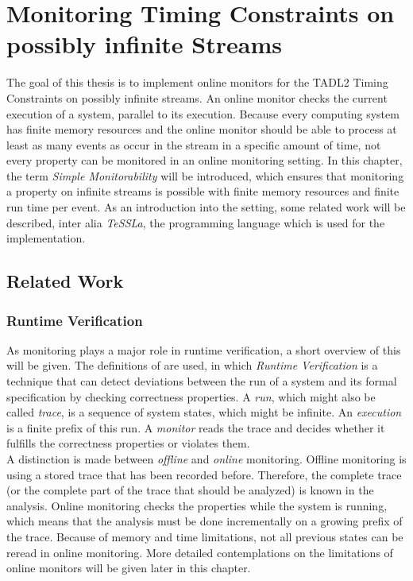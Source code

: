 
\chapter{Monitoring Timing Constraints on possibly infinite Streams}
\label{chapter-monitorability}
	The goal of this thesis is to implement online monitors for the TADL2 Timing Constraints on possibly infinite streams. An online monitor checks the current execution of a system, parallel to its execution. Because every computing system has finite memory resources and the online monitor should be able to process at least as many events as occur in the stream in a specific amount of time, not every property can be monitored in an online monitoring setting. In this chapter, the term \emph{Simple Monitorability} will be introduced, which ensures that monitoring a property on infinite streams is possible with finite memory resources and finite run time per event. As an introduction into the setting, some related work will be described, inter alia \emph{TeSSLa}, the programming language which is used for the implementation.

\section{Related Work}

	\subsection{Runtime Verification}
		As monitoring plays a major role in runtime verification, a short overview of this will be given. The definitions of \cite{RuntimeVerification} are used, in which \emph{Runtime Verification} is a technique that can detect deviations between the run of a system and its formal specification by checking correctness properties. A \emph{run}, which might also be called \emph{trace}, is a sequence of system states, which might be infinite. An \emph{execution} is a finite prefix of this run. A \emph{monitor} reads the trace and decides whether it fulfills the correctness properties or violates them.\\
		A distinction is made between \emph{offline} and \emph{online} monitoring. Offline monitoring is using a stored trace that has been recorded before. Therefore, the complete trace (or the complete part of the trace that should be analyzed) is known in the analysis. Online monitoring checks the properties while the system is running, which means that the analysis must be done incrementally on a growing prefix of the trace. Because of memory and time limitations, not all previous states can be reread in online monitoring. More detailed contemplations on the limitations of online monitors will be given later in this chapter.

